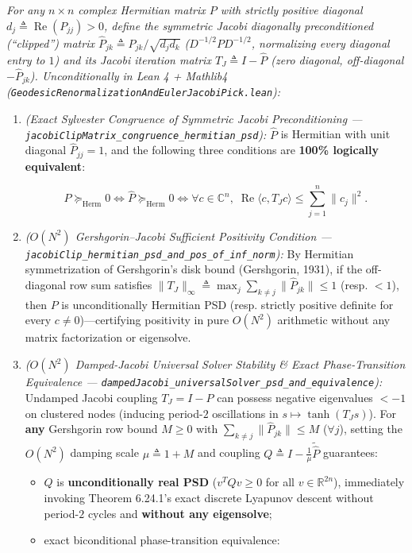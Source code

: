 \documentclass[
  11pt,
]{article}
\begin{document}
\emph{For any \(n \times n\) complex Hermitian matrix \(P\) with
strictly positive diagonal
\(d_j \triangleq \operatorname{Re}(P_{jj}) > 0\), define the symmetric
Jacobi diagonally preconditioned (``clipped'') matrix
\(\widehat{P}_{jk} \triangleq P_{jk} / \sqrt{d_j d_k}\)
(\(D^{-1/2} P D^{-1/2}\), normalizing every diagonal entry to \(1\)) and
its Jacobi iteration matrix \(T_J \triangleq I - \widehat{P}\) (zero
diagonal, off-diagonal \(-\widehat{P}_{jk}\)). Unconditionally in Lean 4
+ Mathlib4 (\texttt{GeodesicRenormalizationAndEulerJacobiPick.lean}):}

\begin{enumerate}
\def\labelenumi{\arabic{enumi}.}
\item
  \emph{(Exact Sylvester Congruence of Symmetric Jacobi Preconditioning
  --- \texttt{jacobiClipMatrix\_congruence\_hermitian\_psd}):}
  \(\widehat{P}\) is Hermitian with unit diagonal
  \(\widehat{P}_{jj} = 1\), and the following three conditions are
  \textbf{100\% logically equivalent}:

  \[P \succeq_{\text{Herm}} 0 \iff \widehat{P} \succeq_{\text{Herm}} 0 \iff \forall c \in \mathbb{C}^n,\; \operatorname{Re}\langle c, T_J c\rangle \le \sum_{j=1}^n \|c_j\|^2.\]
\item
  \emph{(\(O(N^2)\) Gershgorin--Jacobi Sufficient Positivity Condition
  --- \texttt{jacobiClip\_hermitian\_psd\_and\_pos\_of\_inf\_norm}):} By
  Hermitian symmetrization of Gershgorin's disk bound (Gershgorin,
  1931), if the off-diagonal row sum satisfies
  \(\|T_J\|_\infty \triangleq \max_j \sum_{k \neq j} \|\widehat{P}_{jk}\| \le 1\)
  (resp. \(< 1\)), then \(P\) is unconditionally Hermitian PSD (resp.
  strictly positive definite for every \(c \neq 0\))---certifying
  positivity in pure \(O(N^2)\) arithmetic without any matrix
  factorization or eigensolve.
\item
  \emph{(\(O(N^2)\) Damped-Jacobi Universal Solver Stability \& Exact
  Phase-Transition Equivalence ---
  \texttt{dampedJacobi\_universalSolver\_psd\_and\_equivalence}):}
  Undamped Jacobi coupling \(T_J = I - \widehat{P}\) can possess
  negative eigenvalues \(< -1\) on clustered nodes (inducing
  period-\(2\) oscillations in \(s \mapsto \tanh(T_J s)\)). For
  \textbf{any} Gershgorin row bound \(M \ge 0\) with
  \(\sum_{k \neq j} \|\widehat{P}_{jk}\| \le M\) (\(\forall j\)),
  setting the \(O(N^2)\) damping scale \(\mu \triangleq 1 + M\) and
  coupling \(Q \triangleq I - \frac{1}{\mu}\widetilde{\widehat{P}}\)
  guarantees:

  \begin{itemize}
  \item
    \(Q\) is \textbf{unconditionally real PSD} (\(v^T Q v \ge 0\) for
    all \(v \in \mathbb{R}^{2n}\)), immediately invoking Theorem
    6.24.1's exact discrete Lyapunov descent without period-\(2\) cycles
    and \textbf{without any eigensolve};
  \item
    exact biconditional phase-transition equivalence:


\end{itemize}
\end{enumerate}
\end{document}
